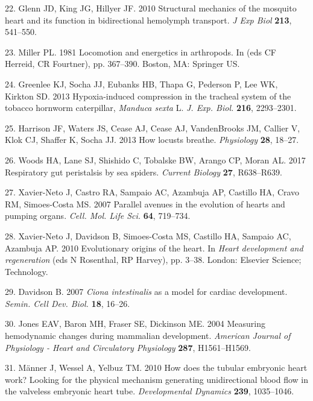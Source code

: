 \documentclass[
]{article}
\newenvironment{cslreferences}%
  {}%
  {\par}
\begin{document}
\begin{cslreferences}
\leavevmode\hypertarget{ref-Glenn:2010}{}%
22. Glenn JD, King JG, Hillyer JF. 2010 Structural mechanics of the
mosquito heart and its function in bidirectional hemolymph transport.
\emph{J Exp Biol} \textbf{213}, 541--550.

\leavevmode\hypertarget{ref-Miller:1981}{}%
23. Miller PL. 1981 Locomotion and energetics in arthropods. In (eds CF
Herreid, CR Fourtner), pp. 367--390. Boston, MA: Springer US.

\leavevmode\hypertarget{ref-Greenlee:2013}{}%
24. Greenlee KJ, Socha JJ, Eubanks HB, Thapa G, Pederson P, Lee WK,
Kirkton SD. 2013 Hypoxia-induced compression in the tracheal system of
the tobacco hornworm caterpillar, \emph{Manduca sexta} L. \emph{J. Exp.
Biol.} \textbf{216}, 2293--2301.

\leavevmode\hypertarget{ref-Harrison:2013}{}%
25. Harrison JF, Waters JS, Cease AJ, Cease AJ, VandenBrooks JM, Callier
V, Klok CJ, Shaffer K, Socha JJ. 2013 How locusts breathe.
\emph{Physiology} \textbf{28}, 18--27.

\leavevmode\hypertarget{ref-Woods:2017}{}%
26. Woods HA, Lane SJ, Shishido C, Tobalske BW, Arango CP, Moran AL.
2017 Respiratory gut peristalsis by sea spiders. \emph{Current Biology}
\textbf{27}, R638--R639.

\leavevmode\hypertarget{ref-Xavier-Neto:2007}{}%
27. Xavier-Neto J, Castro RA, Sampaio AC, Azambuja AP, Castillo HA,
Cravo RM, Simoes-Costa MS. 2007 Parallel avenues in the evolution of
hearts and pumping organs. \emph{Cell. Mol. Life Sci.} \textbf{64},
719--734.

\leavevmode\hypertarget{ref-Xavier-Neto:2010}{}%
28. Xavier-Neto J, Davidson B, Simoes-Costa MS, Castillo HA, Sampaio AC,
Azambuja AP. 2010 Evolutionary origins of the heart. In \emph{Heart
development and regeneration} (eds N Rosenthal, RP Harvey), pp. 3--38.
London: Elsevier Science; Technology.

\leavevmode\hypertarget{ref-Davidson:2007}{}%
29. Davidson B. 2007 \emph{Ciona intestinalis} as a model for cardiac
development. \emph{Semin. Cell Dev. Biol.} \textbf{18}, 16--26.

\leavevmode\hypertarget{ref-Jones:2004}{}%
30. Jones EAV, Baron MH, Fraser SE, Dickinson ME. 2004 Measuring
hemodynamic changes during mammalian development. \emph{American Journal
of Physiology - Heart and Circulatory Physiology} \textbf{287},
H1561--H1569.

\leavevmode\hypertarget{ref-Manner:2010}{}%
31. Männer J, Wessel A, Yelbuz TM. 2010 How does the tubular embryonic
heart work? Looking for the physical mechanism generating unidirectional
blood flow in the valveless embryonic heart tube. \emph{Developmental
Dynamics} \textbf{239}, 1035--1046.


\end{cslreferences}
\end{document}
